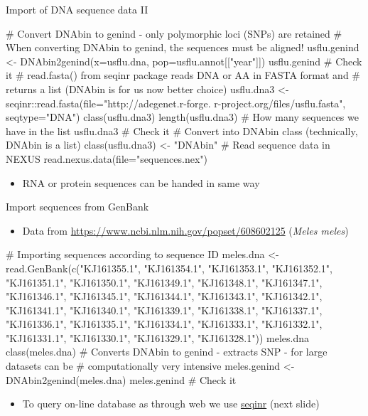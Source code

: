 \documentclass[compress, ucs, xelatex, 11pt, xcolor=svgnames,
  hyperref={
    bookmarks=true,
    unicode=true,
    colorlinks=true,
    pdftitle={Molecular data in R},
    plainpages=false,
    pdfauthor={Vojtech Zeisek},
    pdfsubject={Course about phylogeny and evolution in R},
    pdfcreator={XeLaTeX},
    pdfkeywords={R, evolution, phylogeny, molecular data},
    linkcolor=Tomato,
    anchorcolor=SaddleBrown,
    citecolor=Goldenrod,
    filecolor=DarkMagenta,
    menucolor=Sienna,
    urlcolor=DarkTurquoise,
    pdftex},
  url={hyphens, lowtilde} %
  ]{beamer}
\begin{document}
\begin{frame}[fragile]{Import of DNA sequence data II}
  \begin{spluscode}
    # Convert DNAbin to genind - only polymorphic loci (SNPs) are retained
    # When converting DNAbin to genind, the sequences must be aligned!
    usflu.genind <- DNAbin2genind(x=usflu.dna, pop=usflu.annot[["year"]])
    usflu.genind # Check it
    # read.fasta() from seqinr package reads DNA or AA in FASTA format and
    # returns a list (DNAbin is for us now better choice)
    usflu.dna3 <- seqinr::read.fasta(file="http://adegenet.r-forge.
      r-project.org/files/usflu.fasta", seqtype="DNA")
    class(usflu.dna3)
    length(usflu.dna3) # How many sequences we have in the list
    usflu.dna3 # Check it
    # Convert into DNAbin class (technically, DNAbin is a list)
    class(usflu.dna3) <- "DNAbin"
    # Read sequence data in NEXUS
    read.nexus.data(file="sequences.nex")
  \end{spluscode}
  \begin{itemize}
    \item RNA or protein sequences can be handed in same way
  \end{itemize}
\end{frame}

\begin{frame}[fragile]{Import sequences from GenBank}
  \begin{itemize}
    \item Data from \url{https://www.ncbi.nlm.nih.gov/popset/608602125} (\textit{Meles meles})
  \end{itemize}
  \begin{spluscode}
    # Importing sequences according to sequence ID
    meles.dna <- read.GenBank(c("KJ161355.1", "KJ161354.1", "KJ161353.1",
      "KJ161352.1", "KJ161351.1", "KJ161350.1", "KJ161349.1", "KJ161348.1",
      "KJ161347.1", "KJ161346.1", "KJ161345.1", "KJ161344.1", "KJ161343.1",
      "KJ161342.1", "KJ161341.1", "KJ161340.1", "KJ161339.1", "KJ161338.1",
      "KJ161337.1", "KJ161336.1", "KJ161335.1", "KJ161334.1", "KJ161333.1",
      "KJ161332.1", "KJ161331.1", "KJ161330.1", "KJ161329.1", "KJ161328.1"))
    meles.dna
    class(meles.dna)
    # Converts DNAbin to genind - extracts SNP - for large datasets can be
    # computationally very intensive
    meles.genind <- DNAbin2genind(meles.dna)
    meles.genind # Check it
  \end{spluscode}
  \begin{itemize}
    \item To query on-line database as through web we use \href{https://cran.r-project.org/web/packages/seqinr/index.html}{seqinr} (next slide)
  \end{itemize}
\end{frame}
\end{document}
